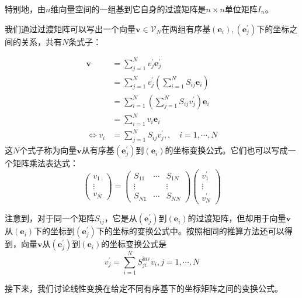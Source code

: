 \documentclass[../main.tex]{subfiles}
\begin{document}
特别地，由$n$维向量空间的一组基到它自身的过渡矩阵是$n\times n$单位矩阵$I_n$。

我们通过过渡矩阵可以写出一个向量$\mathbf{v}\in\mathcal{V}_N$在两组有序基$\left(\mathbf{e}_i\right),\left(\mathbf{e}^\prime_j\right)$下的坐标之间的关系，共有$N$条式子：

\begin{align*}
    \mathbf{v}          & =\sum_{j=1}^Nv^\prime_j\mathbf{e}^\prime_j                          \\
                        & =\sum_{j=1}^Nv^\prime_j\left(\sum_{i=1}^NS_{ij}\mathbf{e}_i\right)  \\
                        & =\sum_{i=1}^N\left(\sum_{j=1}^N S_{ij}v^\prime_j\right)\mathbf{e}_i \\
                        & =\sum_{i=1}^Nv_i\mathbf{e}_i                                        \\
    \Leftrightarrow v_i & =\sum_{j=1}^NS_{ij}v^\prime_j,,\quad i=1,\cdots,N
\end{align*}
这$N$个式子称为向量$\mathbf{v}$从有序基$\left(\mathbf{e}^\prime_j\right)$到$\left(\mathbf{e}_i\right)$的坐标变换公式。它们也可以写成一个矩阵乘法表达式：
\[\left(\begin{array}{c}v_1\\\vdots\\v_N\end{array}\right)=\left(\begin{array}{ccc}S_{11}&\cdots&S_{1N}\\\vdots&&\vdots\\S_{N1}&\cdots&S_{NN}\end{array}\right)\left(\begin{array}{c}v^\prime_1\\\vdots\\v^\prime_N\end{array}\right)\]

注意到，对于同一个矩阵$S_{ij}$，它是从$\left(\mathbf{e}^\prime_j\right)$到$\left(\mathbf{e}_i\right)$的过渡矩阵，但却用于向量$\mathbf{v}$从$\left(\mathbf{e}_i\right)$下的坐标到$\left(\mathbf{e}^\prime_j\right)$下的坐标的变换公式中。按照相同的推算方法还可以得到，向量$\mathbf{v}$从$\left(\mathbf{e}^\prime_j\right)$到$\left(\mathbf{e}_i\right)$的坐标变换公式是\[v^\prime_j=\sum_{i=1}^NS^\mathrm{inv}_{ji}v_i,j=1,\cdots,N\]

接下来，我们讨论线性变换在给定不同有序基下的坐标矩阵之间的变换公式。
\end{document}
